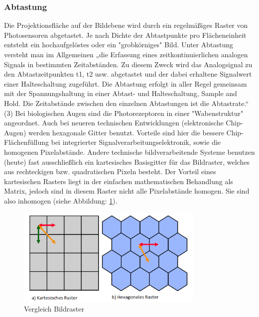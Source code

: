\subsubsection{Abtastung}

Die Projektionsfläche auf der Bildebene wird durch ein regelmäßiges Raster von Photosensoren abgetastet. Je nach Dichte der Abtastpunkte pro Flächeneinheit entsteht ein hochaufgelöstes oder ein "grobkörniges" Bild. Unter Abtastung versteht man im Allgemeinen „die Erfassung eines zeitkontinuierlichen analogen Signals in bestimmten Zeitabständen. Zu diesem Zweck wird das Analogsignal zu den Abtastzeitpunkten t1, t2 usw. abgetastet und der dabei erhaltene Signalwert einer Halteschaltung zugeführt. Die Abtastung erfolgt in aller Regel gemeinsam mit der Spannungshaltung in einer Abtast- und Halteschaltung, Sample and Hold. Die Zeitabstände zwischen den einzelnen Abtastungen ist die Abtastrate.“ (3)
Bei biologischen Augen sind die Photorezeptoren in einer "Wabenstruktur" angeordnet. 
Auch bei neueren technischen Entwicklungen (elektronische Chip- Augen) werden hexagonale Gitter benutzt. Vorteile sind hier die bessere Chip-Flächenfüllung bei integrierter Signalverarbeitungselektronik, sowie die homogenen Pixelabstände. Andere technische bildverarbeitende Systeme benutzen (heute) fast ausschließlich ein kartesisches Basisgitter für das Bildraster, welches aus rechteckigen bzw. quadratischen Pixeln besteht. Der Vorteil eines kartesischen Rasters liegt in der einfachen mathematischen Behandlung als Matrix, jedoch sind in diesem Raster nicht alle Pixelabstände homogen. Sie sind also inhomogen (siehe Abbildung: \ref{fig:bildraster_steph}).

\begin{figure}[h]
	\centering
		\includegraphics[width=0.8\textwidth]{img/vergleich_bildraster_Steph.png}
	\caption[Vergleich Bildraster]{Vergleich Bildraster}
	\label{fig:bildraster_steph}
\end{figure}

